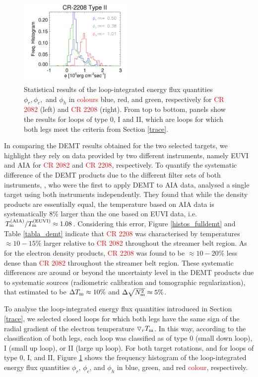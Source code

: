 \documentclass[namedreferences]{solarphysics}
\def\edit#1{\textcolor{Red}{#1}}
\newcommand{\dr}{\triangledown_r}
\newcommand{\Tm}{T_{\rm m}}
\newcommand{\Nsqm}{N^2_{{\rm m}}}
\newcommand{\sqravgN}{\sqrt{\Nsqm}}
\begin{document}
\begin{article}
\begin{figure}[h!]
\begin{center}
\includegraphics[width=0.495\textwidth]{histocr2208_cgenergia.pdf}
\caption{{Statistical results of the loop-integrated energy flux quantities $\phi_r,\phi_c,$ and $\phi_h$ in \edit{colours} blue, red, and green, respectively for \edit{CR 2082} (left) and \edit{CR 2208} (right). From top to bottom, panels show the results for loops of type 0, I and II, which are loops for which both legs meet the criteria from Section \ref{trace}.}}
\label{energia_demt}
\end{center}
\end{figure} 

In comparing the DEMT results obtained for the two selected targets, {we highlight} they rely on data provided by two different instruments, {namely EUVI and AIA for \edit{CR 2082} and \edit{CR 2208}, respectively.} To quantify the systematic difference of the DEMT products {due to the different filter sets of} both instruments, \citet{nuevo_2015}, who were the first to apply DEMT to AIA data, {analysed} a single target using both instruments independently. They found that while the density {products are} essentially equal, the temperature {based on AIA data} is systematically 8\% larger than the one based on EUVI data, {i.e.} $\Tm^{\rm(AIA)}/\Tm^{\rm(EUVI)} \approx 1.08$. Considering {this error}, Figure \ref{histos_fulldemt} and Table \ref{tabla_demt} indicate that \edit{CR 2208} was {characterised by temperatures $\approx 10-15\%$ larger relative to \edit{CR 2082}} throughout the streamer belt region. As for the electron density products, \edit{CR 2208} was found to be $\approx 10-20\%$ less dense than \edit{CR 2082} throughout the streamer belt region. These systematic differences are {around or beyond the uncertainty level in the DEMT products due to systematic sources (radiometric calibration and tomographic regularization), that \citet{lloveras_2017} {estimated to be $\Delta\Tm\approx 10\%$ and $\Delta\sqravgN\approx 5\%$}.}

{To analyse the loop-integrated energy flux quantities introduced in Section \ref{trace}, we selected closed loops for which both legs have the same sign of the radial gradient of the electron temperature $\dr\Tm$.} In this way, according to the classification of both legs, each loop was classified as of type 0 (small down loop), I (small up loop), or II (large up loop). {For both target rotations, and for loops of type 0, I, and II, Figure \ref{energia_demt} shows the frequency histogram of the loop-integrated energy flux quantities {$\phi_r$, $\phi_c$, and $\phi_h$ in blue, green, and red \edit{colour}}, respectively.}


\end{article}
\end{document}
